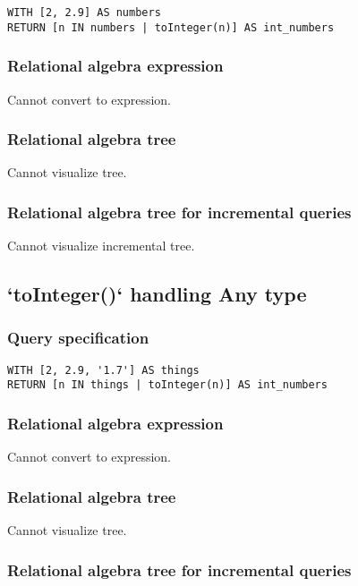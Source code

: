 \begin{lstlisting}
WITH [2, 2.9] AS numbers
RETURN [n IN numbers | toInteger(n)] AS int_numbers
\end{lstlisting}

\subsubsection*{Relational algebra expression}

Cannot convert to expression.

\subsubsection*{Relational algebra tree}

Cannot visualize tree.

\subsubsection*{Relational algebra tree for incremental queries}

Cannot visualize incremental tree.

\subsection{`toInteger()` handling Any type}

\subsubsection*{Query specification}

\begin{lstlisting}
WITH [2, 2.9, '1.7'] AS things
RETURN [n IN things | toInteger(n)] AS int_numbers
\end{lstlisting}

\subsubsection*{Relational algebra expression}

Cannot convert to expression.

\subsubsection*{Relational algebra tree}

Cannot visualize tree.

\subsubsection*{Relational algebra tree for incremental queries}

